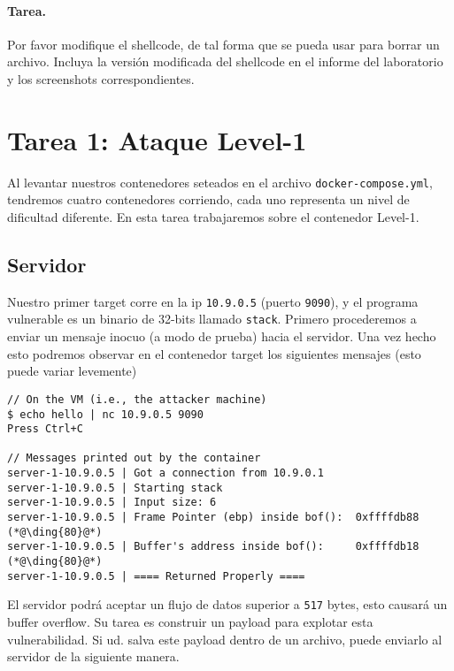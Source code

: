 \paragraph{Tarea.} Por favor modifique el shellcode, de tal forma que se pueda usar para borrar un archivo. Incluya la versión modificada del shellcode en el informe del laboratorio y los screenshots correspondientes.



\section{Tarea 1: Ataque Level-1} 

Al levantar nuestros contenedores seteados en el archivo \texttt{docker-compose.yml}, tendremos cuatro contenedores corriendo, cada uno representa un nivel de dificultad diferente.
En esta tarea trabajaremos sobre el contenedor Level-1.


\subsection{Servidor} 

Nuestro primer target corre en la ip \texttt{10.9.0.5} (puerto \texttt{9090}), y el programa vulnerable es un binario de 32-bits llamado \texttt{stack}.
Primero procederemos a enviar un mensaje inocuo (a modo de prueba) hacia el servidor.
Una vez hecho esto podremos observar en el contenedor target los siguientes mensajes (esto puede variar levemente)

\begin{lstlisting}
// On the VM (i.e., the attacker machine)
$ echo hello | nc 10.9.0.5 9090
Press Ctrl+C

// Messages printed out by the container
server-1-10.9.0.5 | Got a connection from 10.9.0.1
server-1-10.9.0.5 | Starting stack
server-1-10.9.0.5 | Input size: 6
server-1-10.9.0.5 | Frame Pointer (ebp) inside bof():  0xffffdb88    (*@\ding{80}@*)
server-1-10.9.0.5 | Buffer's address inside bof():     0xffffdb18    (*@\ding{80}@*)
server-1-10.9.0.5 | ==== Returned Properly ====
\end{lstlisting}

El servidor podrá aceptar un flujo de datos superior a \texttt{517} bytes, esto causará un buffer overflow. Su tarea es construir un payload para explotar esta vulnerabilidad. Si ud. salva este payload dentro de un archivo, puede enviarlo al servidor de la siguiente manera.

